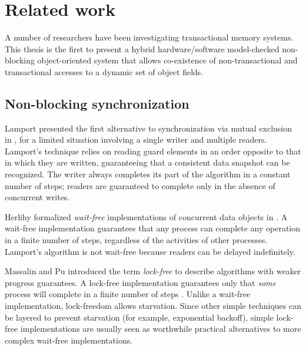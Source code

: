 \chapter{Related work}\label{cha:related}

A number of researchers have been investigating transactional memory
systems.  This thesis is the first to present a hybrid hardware/software
model-checked non-blocking
object-oriented system that allows co-existence of non-transactional and
transactional accesses to a dynamic set of object fields.

\section{Non-blocking synchronization}\label{sec:nb-sync}

Lamport presented the first alternative to synchronization via mutual
exclusion in \cite{Lamport77}, for a limited situation involving a single
writer and multiple readers.  Lamport's technique relies on reading
guard elements in an order opposite to that in which they are written,
guaranteeing that a consistent data snapshot can be recognized.  The
writer always completes its part of the algorithm in a constant number
of steps; readers are guaranteed to complete only in the absence of
concurrent writes.

Herlihy formalized \emph{wait-free} implementations of
concurrent data objects in \cite{Herlihy88}.  A wait-free implementation
guarantees that any process can complete any operation in a finite
number of steps, regardless of the activities of other processes.
Lamport's algorithm is not wait-free
because readers can be delayed indefinitely.

Massalin and Pu introduced the term \emph{lock-free} to describe 
algorithms with weaker progress guarantees.
A lock-free implementation guarantees only that \emph{some}
process will complete in a finite number of steps
\cite{MassalinPu91}.  Unlike a wait-free implementation,
lock-freedom allows starvation.  Since other simple techniques can be
layered to prevent starvation (for example, exponential backoff),
simple lock-free implementations are usually seen as worthwhile practical
alternatives to more complex wait-free implementations.

